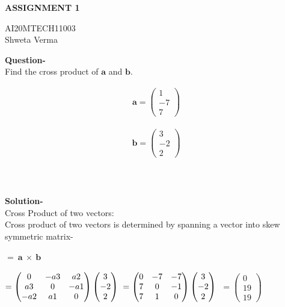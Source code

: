 \documentclass[11pt]{article}
\newcommand{\myvec}[1]{\ensuremath{\begin{pmatrix}#1\end{pmatrix}}}
\renewcommand{\vec}[1]{\boldsymbol{#1}}
\begin{document}
\begin{center}
\huge\textbf{ASSIGNMENT 1} 

\Large AI20MTECH11003
\\
\large Shweta Verma
\\

\end{center}
\large\textbf{Question-} 
\\
Find the cross product of $\boldsymbol{a}$ and $\boldsymbol{b}$.


\begin{align*}
\vec{a} = \myvec{1\\-7\\7}
\end{align*}


\begin{align*}
\vec{b} = \myvec{3\\-2\\2}
\end{align*}
\\
\\
\\
\large\textbf{Solution-}
\\
Cross Product of two vectors: 
\\
Cross product of two vectors is determined by spanning a vector into skew symmetric matrix-
\\
\\
$\boldsymbol{ = ~a ~\times~ b}$
\\
\\
$
=\myvec
   {0 & -a3 & a2\\
   a3 & 0 & -a1\\
   -a2 & a1 & 0\\}
  \myvec{3\\-2\\2}
\\
\\
\\
$
$
= \myvec
  {0 & -7 & -7\\
  7 & 0 & -1\\
  7 & 1 & 0\\}
 \myvec{3\\-2\\2}
\\
\\
\\
$
$
=\myvec{0\\19\\19}
$
\end{document}

